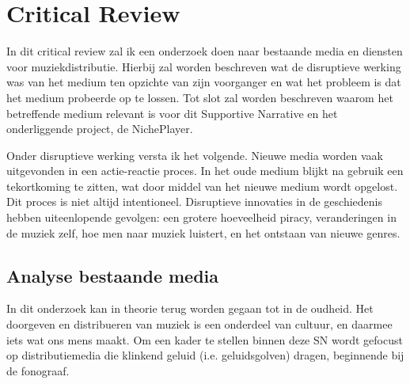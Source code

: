 \section{Critical Review}
\captionsetup[figure]{font=small,labelfont=bf}


In dit critical review zal ik een onderzoek doen naar bestaande media en diensten voor muziekdistributie. Hierbij zal worden beschreven wat de disruptieve werking was van het medium ten opzichte van zijn voorganger en wat het probleem is dat het medium probeerde op te lossen. Tot slot zal worden beschreven waarom het betreffende medium relevant is voor dit Supportive Narrative en het onderliggende project, de NichePlayer.

Onder disruptieve werking versta ik het volgende. Nieuwe media worden vaak uitgevonden in een actie-reactie proces. In het oude medium blijkt na gebruik een tekortkoming te zitten, wat door middel van het nieuwe medium wordt opgelost. Dit proces is niet altijd intentioneel.  Disruptieve innovaties in de geschiedenis hebben uiteenlopende gevolgen: een grotere hoeveelheid piracy, veranderingen in de muziek zelf, hoe men naar muziek luistert, en het ontstaan van nieuwe genres.

\subsection{Analyse bestaande media}
In dit onderzoek kan in theorie terug worden gegaan tot in de oudheid. Het doorgeven en distribueren van muziek is een onderdeel van cultuur, en daarmee iets wat ons mens maakt. Om een kader te stellen binnen deze SN wordt gefocust op distributiemedia die klinkend geluid (i.e. geluidsgolven) dragen, beginnende bij de fonograaf.

